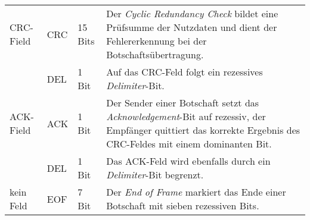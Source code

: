 \begin{table}[!htbp]
\begin{tabular}{l | l l p{7.5cm}}
		\midrule
		CRC-Field         & CRC        & 15 Bits     & Der \emph{Cyclic Redundancy Check} bildet eine Prüfsumme der Nutzdaten und dient der Fehlererkennung bei der Botschaftsübertragung.                                                                               \\
		                  & DEL        & 1 Bit       & Auf das CRC-Feld folgt ein rezessives \emph{Delimiter}-Bit.                                      \\
		\midrule
		ACK-Field         & ACK        & 1 Bit       & Der Sender einer Botschaft setzt das \emph{Acknowledgement}-Bit auf rezessiv, der Empfänger quittiert das korrekte Ergebnis des CRC-Feldes mit einem dominanten Bit.                                              \\
		                  & DEL        & 1 Bit       & Das ACK-Feld wird ebenfalls durch ein \emph{Delimiter}-Bit begrenzt.                                                                                                                                              \\
		\midrule
		kein Feld         & EOF        & 7 Bit       & Der \emph{End of Frame} markiert das Ende einer Botschaft mit sieben rezessiven Bits.                                                                                                                             \\ \bottomrule
	\end{tabular}
	
	\label{tab:CAN-Data-Frame}
\end{table}

